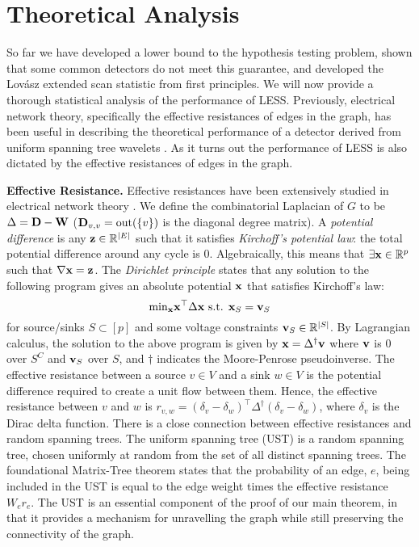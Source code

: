 \vspace{-.2cm}
\section{Theoretical Analysis}
\label{sec:theory}
\vspace{-.2cm}
So far we have developed a lower bound to the hypothesis testing problem, shown that some common detectors do not meet this guarantee, and developed the Lov\'asz extended scan statistic from first principles.
We will now provide a thorough statistical analysis of the performance of LESS.
Previously, electrical network theory, specifically the effective resistances of edges in the graph, has been useful in describing the theoretical performance of a detector derived from uniform spanning tree wavelets \cite{sharpnack2012detecting}.
As it turns out the performance of LESS is also dictated by the effective resistances of edges in the graph.

{\bf Effective Resistance.} Effective resistances have been extensively studied in electrical network theory \cite{lyons2000probability}.
We define the combinatorial Laplacian of $G$ to be $\Delta = \mathbf{D} - \mathbf{W}$ ($\mathbf{D}_{v,v} = \textrm{out}(\{v\})$ is the diagonal degree matrix).
A {\em potential difference} is any $\mathbf{z} \in \mathbb{R}^{|E|}$ such that it satisfies {\em Kirchoff's potential law}: the total potential difference around any cycle is $0$.
Algebraically, this means that $\exists \mathbf{x} \in \mathbb{R}^{p}$ such that $\nabla \mathbf{x} = \mathbf{z}$.
The {\em Dirichlet principle} states that any solution to the following program gives an absolute potential $\mathbf{x}$ that satisfies Kirchoff's law:
\[
\textrm{min}_{\mathbf{x}} \mathbf{x}^\top \Delta \mathbf{x} \textrm{ s.t. } \mathbf{x}_S = \mathbf{v}_S
\]
for source/sinks $S \subset [p]$ and some voltage constraints $\mathbf{v}_S \in \mathbb{R}^{|S|}$.  
By Lagrangian calculus, the solution to the above program is given by $\mathbf{x} = \Delta^\dagger \mathbf{v}$ where $\mathbf{v}$ is $0$ over $S^C$ and $\mathbf{v}_S$ over $S$, and $\dagger$ indicates the Moore-Penrose pseudoinverse.
The effective resistance between a source $v\in V$ and a sink $w\in V$ is the potential difference required to create a unit flow between them. 
Hence, the effective resistance between $v$ and $w$ is $r_{v,w} = (\delta_v - \delta_w)^\top \Delta^\dagger (\delta_v - \delta_w)$, where $\delta_v$ is the Dirac delta function.
There is a close connection between effective resistances and random spanning trees.
The uniform spanning tree (UST) is a random spanning tree, chosen uniformly at random from the set of all distinct spanning trees.
The foundational Matrix-Tree theorem \cite{kirchhoff1847ueber,lyons2000probability} states that the probability of an edge, $e$, being included in the UST is equal to the edge weight times the effective resistance $W_e r_e$.
The UST is an essential component of the proof of our main theorem, in that it provides a mechanism for unravelling the graph while still preserving the connectivity of the graph.


